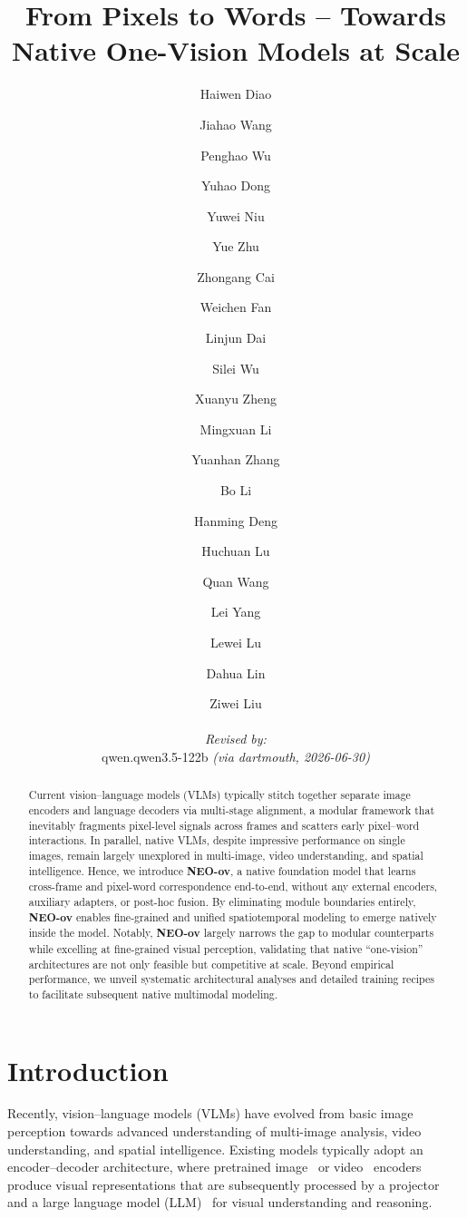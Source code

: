 \documentclass{llmxive}
\title{From Pixels to Words -- Towards Native One-Vision Models at Scale}
\author{Haiwen Diao \and Jiahao Wang \and Penghao Wu \and Yuhao Dong \and Yuwei Niu \and Yue Zhu \and Zhongang Cai \and Weichen Fan \and Linjun Dai \and Silei Wu \and Xuanyu Zheng \and Mingxuan Li \and Yuanhan Zhang \and Bo Li \and Hanming Deng \and Huchuan Lu \and Quan Wang \and Lei Yang \and Lewei Lu \and Dahua Lin \and Ziwei Liu
  \par\hrule\par
  \textit{Revised by:}\\
  qwen.qwen3.5-122b \textit{(via dartmouth, 2026-06-30)}}
\begin{document}
\maketitle
\begin{abstract}
Current vision–language models (VLMs) typically stitch together separate image encoders and language decoders via multi-stage alignment, a modular framework that inevitably fragments pixel-level signals across frames and scatters early pixel–word interactions.
In parallel, native VLMs, despite impressive performance on single images, remain largely unexplored in multi-image, video understanding, and spatial intelligence.
%
Hence, we introduce \textbf{NEO-ov}, a native foundation model that learns cross-frame and pixel-word correspondence end-to-end, without any external encoders, auxiliary adapters, or post-hoc fusion. 
By eliminating module boundaries entirely, \textbf{NEO-ov} enables fine-grained and unified spatiotemporal modeling to emerge natively inside the model.
%
Notably, \textbf{NEO-ov} largely narrows the gap to modular counterparts while excelling at fine-grained visual perception, validating that native “one-vision” architectures are not only feasible but competitive at scale. 
%
Beyond empirical performance, we unveil systematic architectural analyses and detailed training recipes to facilitate subsequent native multimodal modeling.
\end{abstract}

\section{Introduction}
\label{sec:intro}

Recently, vision–language models (VLMs) have evolved from basic image perception towards advanced understanding of multi-image analysis, video understanding, and spatial intelligence.
%
Existing models typically adopt an encoder–decoder architecture, where pretrained image~\cite{VLP:CLIP,VLP:SigLIP} or video~\cite{VLM:videochat,VLM:LLaVAPrime} encoders produce visual representations that are subsequently processed by a projector~\cite{VLM:LLaVA-1.5,VLM:Deepstack,VLM:InstructBLIP,VLM:langbridge} and a large language model (LLM)~\cite{TransF:LLaMA2,TransF:Qwen3} for visual understanding and reasoning.
\end{document}
